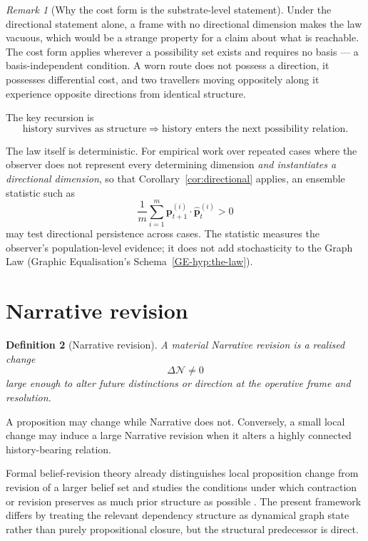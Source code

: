 \documentclass[11pt,a4paper]{article}
\newtheorem{definition}{Definition}[section]
\theoremstyle{remark}
\newtheorem{remark}[definition]{Remark}
\newcommand{\Narr}{\mathcal N}
\begin{document}
\begin{remark}[Why the cost form is the substrate-level statement]\label{rem:cost-form-substrate}
Under the directional statement alone, a frame with no directional dimension makes the law vacuous, which would be a strange property for a claim about what is reachable. The cost form applies wherever a possibility set exists and requires no basis --- a basis-independent condition. A worn route does not possess a direction, it possesses differential cost, and two travellers moving oppositely along it experience opposite directions from identical structure.
\end{remark}

The key recursion is
\[
\boxed{\text{history survives as structure}\Rightarrow\text{history enters the next possibility relation}.}
\]

The law itself is deterministic. For empirical work over repeated cases where the observer does not represent every determining dimension \emph{and instantiates a directional dimension}, so that Corollary~\ref{cor:directional} applies, an ensemble statistic such as
\[
\frac{1}{m}\sum_{i=1}^{m}\mathbf p^{(i)}_{t+1}\cdot\widehat{\mathbf p}^{(i)}_t>0
\]
may test directional persistence across cases. The statistic measures the observer's population-level evidence; it does not add stochasticity to the Graph Law (Graphic Equalisation's Schema~\ref{GE-hyp:the-law}).

\section{Narrative revision}\label{sec:revision}
\begin{definition}[Narrative revision]\label{def:narrative-revision}
A material Narrative revision is a realised change
\[
\Delta\Narr\neq0
\]
large enough to alter future distinctions or direction at the operative frame and resolution.
\end{definition}

A proposition may change while Narrative does not. Conversely, a small local change may induce a large Narrative revision when it alters a highly connected history-bearing relation.

Formal belief-revision theory already distinguishes local proposition change from revision of a larger belief set and studies the conditions under which contraction or revision preserves as much prior structure as possible \citep{agm1985}. The present framework differs by treating the relevant dependency structure as dynamical graph state rather than purely propositional closure, but the structural predecessor is direct.
\end{document}
